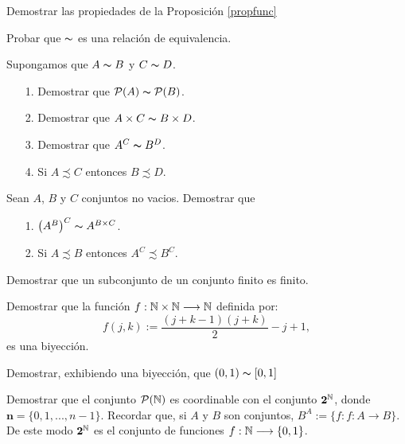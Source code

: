 \begin{ejercicio}\label{3} Demostrar las propiedades de la
Proposición \vref{propfunc}
\end{ejercicio}
\begin{ejercicio}\label{1} Probar que $\thicksim$ es una
relación de equivalencia.
\end{ejercicio}
\begin{ejercicio}\label{1.2} Supongamos que $A\thicksim B$ y
$C\thicksim D$.
\begin{itemize}
\item[1.] Demostrar que $\mathcal{P}(A)\thicksim \mathcal{P}(B)$.
\item[2.] Demostrar que $A\times C\thicksim B\times D$.
\item[3.] Demostrar que $A^C\thicksim B^D$.
\item[4.] Si $A\precsim C$ entonces $B\precsim D$.
\end{itemize}
\end{ejercicio}
\begin{ejercicio}\label{potdelapot} Sean $A$, $B$ y $C$ conjuntos
no vacios. Demostrar que
\begin{itemize}
\item[1.] $\bigl(A^{B}\bigr)^C\thicksim A^{B\times C}$.
\item[2.] Si $A\precsim B$ entonces $A^C\precsim B^C$.
\end{itemize}
\end{ejercicio}

\begin{ejercicio}\label{1.5} Demostrar que un subconjunto de un conjunto
finito es finito.
\end{ejercicio}
\begin{ejercicio}\label{2} Demostrar que la función
$f:\mathbb{N}\times\mathbb{N}\longrightarrow\mathbb{N}$ definida por:
\[f(j,k):=\frac{(j+k-1)(j+k)}{2}-j+1,\]
es una biyección.
\end{ejercicio}
\begin{ejercicio}\label{5} Demostrar, exhibiendo una biyección, que $(0,1)\thicksim [0,1]$
\end{ejercicio}
\begin{ejercicio}\label{6} Demostrar que el conjunto
$\mathcal{P}(\mathbb{N})$ es coordinable con el conjunto
$\mathbf{2}^{\mathbb{N}}$, donde $\mathbf{n}=\{0,1,...,n-1\}$. Recordar
que, si $A$ y $B$ son conjuntos, $B^A:=\{f:f:A\longrightarrow
B\}$. De este modo $\mathbf{2}^{\mathbb{N}}$ es el conjunto de funciones
$f:\mathbb{N}\longrightarrow \{0,1\}$.
\end{ejercicio}

